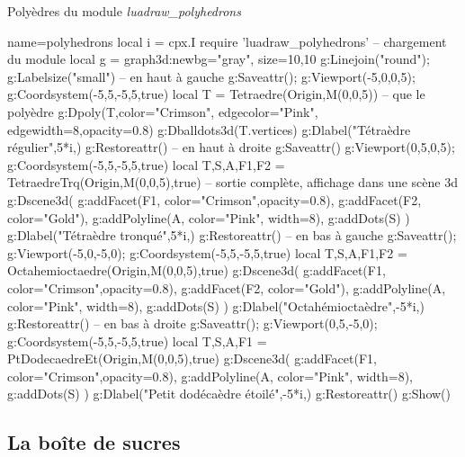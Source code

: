 \begin{demo}{Polyèdres du module \emph{luadraw\_polyhedrons}}
\begin{luadraw}{name=polyhedrons}
local i = cpx.I
require 'luadraw_polyhedrons' -- chargement du module
local g = graph3d:new{bg="gray", size={10,10}}
g:Linejoin("round"); g:Labelsize("small")
-- en haut à gauche 
g:Saveattr(); g:Viewport(-5,0,0,5); g:Coordsystem(-5,5,-5,5,true)
local T = Tetraedre(Origin,M(0,0,5)) -- que le polyèdre
g:Dpoly(T,{color="Crimson", edgecolor="Pink", edgewidth=8,opacity=0.8})
g:Dballdots3d(T.vertices)
g:Dlabel("Tétraèdre régulier",5*i,{})
g:Restoreattr()
-- en haut à droite
g:Saveattr()
g:Viewport(0,5,0,5); g:Coordsystem(-5,5,-5,5,true)
local T,S,A,F1,F2 = TetraedreTrq(Origin,M(0,0,5),true) -- sortie complète, affichage dans une scène 3d
g:Dscene3d(
    g:addFacet(F1, {color="Crimson",opacity=0.8}),
    g:addFacet(F2, {color="Gold"}),
    g:addPolyline(A, {color="Pink", width=8}),
    g:addDots(S) )
g:Dlabel("Tétraèdre tronqué",5*i,{})
g:Restoreattr()
-- en bas à gauche
g:Saveattr(); g:Viewport(-5,0,-5,0); g:Coordsystem(-5,5,-5,5,true)
local T,S,A,F1,F2 = Octahemioctaedre(Origin,M(0,0,5),true)
g:Dscene3d(
    g:addFacet(F1, {color="Crimson",opacity=0.8}),
    g:addFacet(F2, {color="Gold"}),
    g:addPolyline(A, {color="Pink", width=8}),
    g:addDots(S) )
g:Dlabel("Octahémioctaèdre",-5*i,{})
g:Restoreattr()
-- en bas à droite
g:Saveattr(); g:Viewport(0,5,-5,0); g:Coordsystem(-5,5,-5,5,true)
local T,S,A,F1 = PtDodecaedreEt(Origin,M(0,0,5),true)
g:Dscene3d(
    g:addFacet(F1, {color="Crimson",opacity=0.8}),
    g:addPolyline(A, {color="Pink", width=8}),
    g:addDots(S) )
g:Dlabel("Petit dodécaèdre étoilé",-5*i,{})
g:Restoreattr()
g:Show()
\end{luadraw}
\end{demo}

\subsection{La boîte de sucres}

